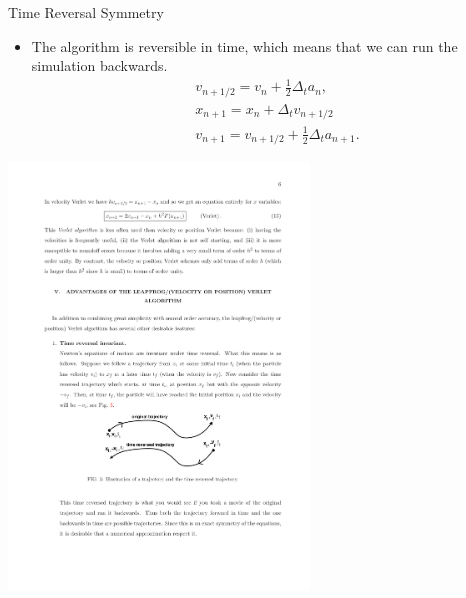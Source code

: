 \documentclass{beamer}
\begin{document}
 \begin{frame}{Time Reversal Symmetry} 
 
  \begin{itemize}
    \item The algorithm is reversible in time, which means that we can run the simulation backwards.
    \begin{align*}
      & v_{n+1 / 2}=v_n+\frac{1}{2} \Delta_t a_n, \\
      & x_{n+1}=x_n+\Delta_t v_{n+1 / 2} \\
      & v_{n+1}=v_{n+1 / 2}+\frac{1}{2} \Delta_t a_{n+1}.
      \end{align*}
  \end{itemize}
  \centerline{\includegraphics[width=0.6\textwidth]{./TimeReversal.pdf}}
 \end{frame}
\end{document}
